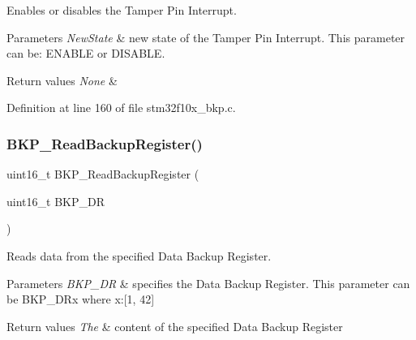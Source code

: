 Enables or disables the Tamper Pin Interrupt. 


\begin{DoxyParams}{Parameters}
{\em New\+State} & new state of the Tamper Pin Interrupt. This parameter can be\+: E\+N\+A\+B\+LE or D\+I\+S\+A\+B\+LE. \\
\hline
\end{DoxyParams}

\begin{DoxyRetVals}{Return values}
{\em None} & \\
\hline
\end{DoxyRetVals}


Definition at line 160 of file stm32f10x\+\_\+bkp.\+c.

\mbox{\label{group___b_k_p___exported___functions_ga359d8fbc945e0f4e34fedbe037d842c8}} 
\subsubsection{\texorpdfstring{B\+K\+P\+\_\+\+Read\+Backup\+Register()}{BKP\_ReadBackupRegister()}}
{\footnotesize\ttfamily uint16\+\_\+t B\+K\+P\+\_\+\+Read\+Backup\+Register (\begin{DoxyParamCaption}\item[{uint16\+\_\+t}]{B\+K\+P\+\_\+\+DR }\end{DoxyParamCaption})}



Reads data from the specified Data Backup Register. 


\begin{DoxyParams}{Parameters}
{\em B\+K\+P\+\_\+\+DR} & specifies the Data Backup Register. This parameter can be B\+K\+P\+\_\+\+D\+Rx where x\+:\mbox{[}1, 42\mbox{]} \\
\hline
\end{DoxyParams}

\begin{DoxyRetVals}{Return values}
{\em The} & content of the specified Data Backup Register \\
\hline
\end{DoxyRetVals}


